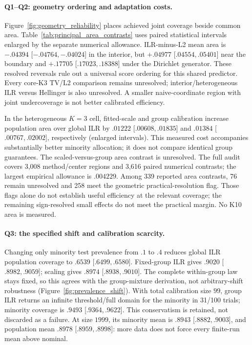 \paragraph{Q1--Q2: geometry ordering and adaptation costs.}
Figure~\ref{fig:geometry_reliability} places achieved joint coverage beside common area. Table~\ref{tab:principal_area_contrasts} uses paired statistical intervals enlarged by the separate numerical allowance. ILR-minus-L2 mean area is $-.04394$ [$-.04764,-.04024$] in the interior, but $+.04977$ [$ .04554,.05401$] near the boundary and $+.17705$ [$ .17023,.18388$] under the Dirichlet generator. These resolved reversals rule out a universal score ordering for this shared predictor. Every core-K3 TV/L2 comparison remains unresolved; interior/heterogeneous ILR versus Hellinger is also unresolved. A smaller naive-coordinate region with joint undercoverage is not better calibrated efficiency.


In the heterogeneous $K=3$ cell, fitted-scale and group calibration increase population area over global ILR by $.01222$ [$ .00608,.01835$] and $.01384$ [$ .00767,.02002$], respectively (enlarged intervals). This measured cost accompanies substantially better minority allocation; it does not compare identical group guarantees. The scaled-versus-group area contrast is unresolved. The full audit covers 3,008 method/center regions and 3,616 paired numerical contrasts; the largest empirical allowance is $.004229$. Among 339 reported area contrasts, 76 remain unresolved and 258 meet the geometric practical-resolution flag. Those flags alone do not establish useful efficiency at the relevant coverage; the remaining sign-resolved small effects do not meet the practical margin. No K10 area is measured.

\paragraph{Q3: the specified shift and calibration scarcity.}
Changing only minority test prevalence from $.1$ to $.4$ reduces global ILR population coverage to $.6539$ [$ .6499,.6580$]. Fixed-group ILR gives $.9020$ [$ .8982,.9059$]; scaling gives $.8974$ [$ .8938,.9010$]. The complete within-group law stays fixed, so this agrees with the group-mixture derivation, not arbitrary-shift robustness (Figure~\ref{fig:prevalence_shift}). With total calibration size $99$, group ILR returns an infinite threshold/full domain for the minority in 31/100 trials; minority coverage is $.9493$ [$ .9364,.9622$]. This conservatism is retained, not discarded as a failure. At size $1999$, its minority mean is $.8943$ [$ .8882,.9003$], and population mean $.8978$ [$ .8959,.8998$]: more data does not force every finite-run mean above nominal.

